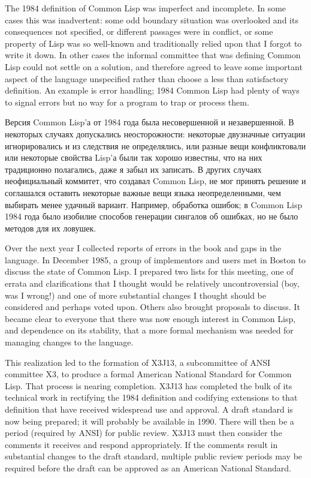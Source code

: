 
The 1984 definition of Common Lisp was imperfect and incomplete.
In some cases this was inadvertent: some odd boundary situation was
overlooked and its consequences not specified, or different
passages were in conflict, or some property of Lisp was so well-known
and traditionally relied upon that I forgot to write it down.
In other cases the informal committee that was defining
Common Lisp could not settle on a solution, and therefore agreed to leave
some important aspect of the language unspecified rather than
choose a less than satisfactory definition.  An example
is error handling; 1984 Common Lisp had plenty of ways to signal
errors but no way for a program to trap or process them.

Версия Common Lisp'а от 1984 года была несовершенной и
незавершенной. В некоторых случаях допускались неосторожности:
некоторые двузначные ситуации игнорировались и из следствия не
определялись, или разные вещи конфликтовали или некоторые свойства
Lisp'а были так хорошо известны, что на них традиционно
полагались, даже я забыл их записать. В других случаях
неофициальный коммитет, что создавал Common Lisp, не мог принять
решение и соглашался оставить некоторые важные вещи языка
неопределенными, чем выбирать менее удачный вариант. Например,
обработка ошибок; в Common Lisp 1984 года было изобилие способов
генерации сингалов об ошибках, но не было методов для их ловушек. 

Over the next year I collected reports of errors in the book and gaps in the
language.  In December 1985, a group of implementors and users met in
Boston to discuss the state of Common Lisp.  I prepared
two lists for this meeting, one of errata and clarifications
that I thought would be relatively uncontroversial (boy, was I wrong!)
and one of more substantial changes I thought should be considered and
perhaps voted upon.  Others also brought proposals to discuss.
It became clear to everyone that there was now enough interest in Common Lisp,
and dependence on its stability, that a more formal mechanism was needed for
managing changes to the language.

This realization led to the formation of X3J13, a subcommittee of
ANSI committee X3, to produce a formal American National Standard
for Common Lisp.  That process is nearing completion.  X3J13 has
completed the bulk of its technical work in rectifying the 1984
definition and codifying extensions to that definition that have
received widespread use and approval.  A draft standard is now
being prepared; it will probably be available
in 1990.  There will then be a period (required by ANSI) for
public review.  X3J13 must then consider the comments it receives
and respond appropriately.  If the comments result
in substantial changes to the draft standard, multiple public review
periods may be required before the draft can be approved as an American
National Standard.

